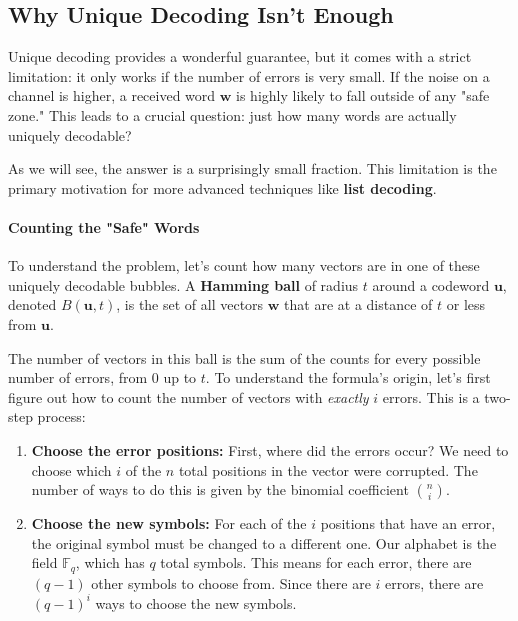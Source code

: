 \documentclass{article}
\begin{document}

\subsection{Why Unique Decoding Isn't Enough}
Unique decoding provides a wonderful guarantee, but it comes with a strict limitation: it only works if the number of errors is very small. If the noise on a channel is higher, a received word $\mathbf{w}$ is highly likely to fall outside of any "safe zone." This leads to a crucial question: just how many words are actually uniquely decodable?

As we will see, the answer is a surprisingly small fraction. This limitation is the primary motivation for more advanced techniques like \textbf{list decoding}.

\paragraph{Counting the "Safe" Words}
To understand the problem, let's count how many vectors are in one of these uniquely decodable bubbles. A \textbf{Hamming ball} of radius $t$ around a codeword $\mathbf{u}$, denoted $B(\mathbf{u}, t)$, is the set of all vectors $\mathbf{w}$ that are at a distance of $t$ or less from $\mathbf{u}$.





The number of vectors in this ball is the sum of the counts for every possible number of errors, from 0 up to $t$. To understand the formula's origin, let's first figure out how to count the number of vectors with \textit{exactly} $i$ errors. This is a two-step process:
\begin{enumerate}
    \item \textbf{Choose the error positions:} First, where did the errors occur? We need to choose which $i$ of the $n$ total positions in the vector were corrupted. The number of ways to do this is given by the binomial coefficient $\binom{n}{i}$.
    \item \textbf{Choose the new symbols:} For each of the $i$ positions that have an error, the original symbol must be changed to a different one. Our alphabet is the field $\mathbb{F}_q$, which has $q$ total symbols. This means for each error, there are $(q-1)$ other symbols to choose from. Since there are $i$ errors, there are $(q-1)^i$ ways to choose the new symbols.
\end{enumerate}
\end{document}

